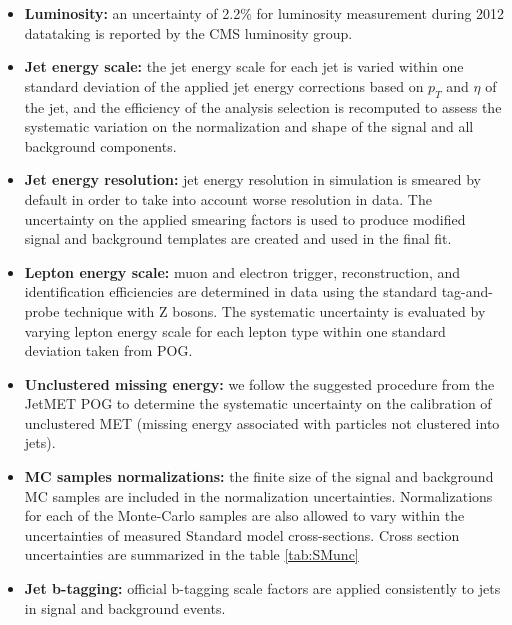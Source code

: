 \begin{itemize}
        \item{\textbf{Luminosity:}}
        an uncertainty of 2.2\% for luminosity measurement during 2012 datataking is reported by the CMS luminosity group.
        \item{\textbf{Jet energy scale:}}
        the jet energy scale for each jet is varied within one standard deviation of the applied jet energy corrections based on $p_T$ and $\eta$ of the jet, and the efficiency of the analysis selection is recomputed to assess the systematic variation on the normalization and shape of the signal and all background components.
        \item{\textbf{Jet energy resolution:}}
        jet energy resolution in simulation is smeared by default in order to take into account worse resolution in data. The uncertainty on the applied smearing factors is used to produce modified signal and background templates are created and used in the final fit.
        \item{\textbf{Lepton energy scale:}}
        muon and electron trigger, reconstruction, and identification efficiencies are determined in data using the standard tag-and-probe technique with Z bosons. The systematic uncertainty is evaluated by varying lepton energy scale for each lepton type within one standard deviation taken from POG.
        \item{\textbf{Unclustered missing energy:}}
        we follow the suggested procedure from the JetMET POG to determine the systematic uncertainty on the calibration of unclustered MET (missing energy associated with particles not clustered into jets).
        \item{\textbf{MC samples normalizations:}}
        the finite size of the signal and background MC samples are included in the normalization uncertainties. Normalizations for each of the Monte-Carlo samples are also allowed to vary within the uncertainties of measured Standard model cross-sections. Cross section uncertainties are summarized in the table \ref{tab:SMunc}
        \item{\textbf{Jet b-tagging:}}
        official b-tagging scale factors are applied consistently to jets in signal and background events.
\end{itemize}

